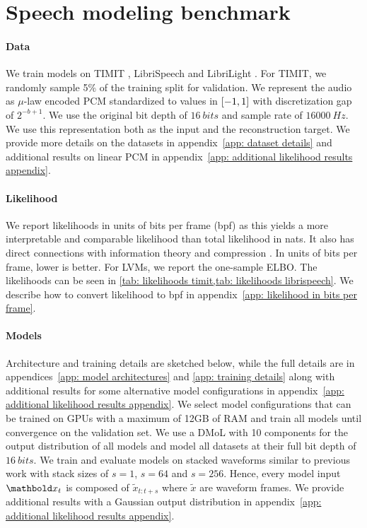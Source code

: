 \section{Speech modeling benchmark}\label{sec:glvm_benchmark}
\paragraph{Data}
We train models on TIMIT \cite{garofolo_timit_1993}, LibriSpeech \cite{panayotov_librispeech_2015} and LibriLight \cite{kahn_libri-light_2020}. For TIMIT, we randomly sample 5\% of the training split for validation. 
We represent the audio as $\mu$-law encoded PCM standardized to values in ${\left[-1, 1\right]}$ with discretization gap of ${2^{-b+1}}$. We use the original bit depth of $\SI{16}{bits}$ and sample rate of $\SI{16000}{Hz}$. We use this representation both as the input and the reconstruction target. We provide more details on the datasets in appendix~\cref{app: dataset details} and additional results on linear PCM in appendix~\cref{app: additional likelihood results appendix}.
%
\paragraph{Likelihood}
We report likelihoods in units of bits per frame (bpf) as this yields a more interpretable and comparable likelihood than total likelihood in nats. It also has direct connections with information theory and compression \cite{shannon_mathematical_1948, townsend_practical_2019}. In units of bits per frame, lower is better. For LVMs, we report the one-sample ELBO. The likelihoods can be seen in \cref{tab: likelihoods timit,tab: likelihoods librispeech}. We describe how to convert likelihood to bpf in appendix~\cref{app: likelihood in bits per frame}.
%
\paragraph{Models}
Architecture and training details are sketched below, while the full details are in appendices~\cref{app: model architectures} and \cref{app: training details} along with additional results for some alternative model configurations in appendix~\cref{app: additional likelihood results appendix}.
We select model configurations that can be trained on GPUs with a maximum of 12GB of RAM and train all models until convergence on the validation set.
We use a DMoL with 10 components for the output distribution of all models and model all datasets at their full bit depth of $\SI{16}{bits}$. We train and evaluate models on stacked waveforms similar to previous work \cite{chung_recurrent_2015, fraccaro_sequential_2016, aksan_stcn_2019} with stack sizes of $s=1$, $s=64$ and $s=256$. Hence, every model input $\xb_t$ is composed of $\tilde{x}_{t:t+s}$ where $\tilde{x}$ are waveform frames. We provide additional results with a Gaussian output distribution in appendix~\cref{app: additional likelihood results appendix}. 

